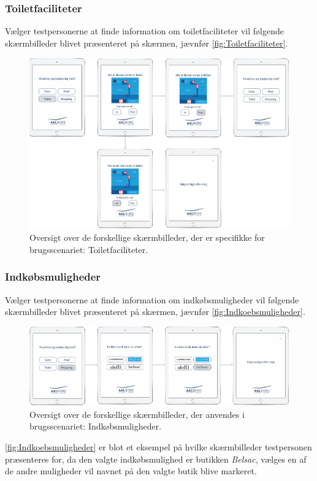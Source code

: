 \subsubsection*{Toiletfaciliteter}
%
Vælger testpersonerne at finde information om toiletfaciliteter vil følgende skærmbilleder blivet præsenteret på skærmen, jævnfør \autoref{fig:Toiletfaciliteter}. 
%
\begin{figure}[H]
\centering
\includegraphics[width = \textwidth]{Figure/Toiletfaciliteter} 
\caption{Oversigt over de forskellige skærmbilleder, der er specifikke for brugsscenariet: Toiletfaciliteter.}
\label{fig:Toiletfaciliteter}
\end{figure}
\noindent
%  
\subsubsection*{Indkøbsmuligheder}
%
Vælger testpersonerne at finde information om indkøbsmuligheder vil følgende skærmbilleder blivet præsenteret på skærmen, jævnfør \autoref{fig:Indkoebsmuligheder}. 
%
\begin{figure}[H]
\centering
\includegraphics[width = \textwidth]{Figure/Indkoebsmuligheder} 
\caption{Oversigt over de forskellige skærmbilleder, der anvendes i brugsscenariet: Indkøbsmuligheder.}
\label{fig:Indkoebsmuligheder}
\end{figure}
\noindent
% 
\autoref{fig:Indkoebsmuligheder} er blot et eksempel på hvilke skærmbilleder testpersonen præsenteres for, da den valgte indkøbsmulighed er butikken \textit{Belsac}, vælges en af de andre muligheder vil navnet på den valgte butik blive markeret. 

